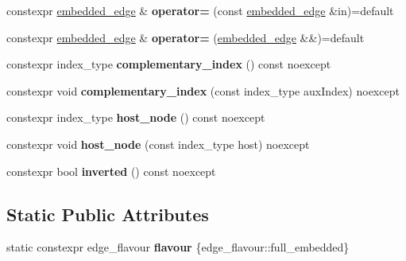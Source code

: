 \begin{DoxyCompactItemize}
\item 
\mbox{\label{classsequoia_1_1maths_1_1embedded__edge_a84dee88dcd34457538bc815160e721dd}} 
constexpr \mbox{\hyperlink{classsequoia_1_1maths_1_1embedded__edge}{embedded\+\_\+edge}} \& {\bfseries operator=} (const \mbox{\hyperlink{classsequoia_1_1maths_1_1embedded__edge}{embedded\+\_\+edge}} \&in)=default
\item 
\mbox{\label{classsequoia_1_1maths_1_1embedded__edge_aeb67baf835feb5f981e90d4304be9445}} 
constexpr \mbox{\hyperlink{classsequoia_1_1maths_1_1embedded__edge}{embedded\+\_\+edge}} \& {\bfseries operator=} (\mbox{\hyperlink{classsequoia_1_1maths_1_1embedded__edge}{embedded\+\_\+edge}} \&\&)=default
\item 
\mbox{\label{classsequoia_1_1maths_1_1embedded__edge_a45b974ba44e020673f6a4ed492123e0c}} 
constexpr index\+\_\+type {\bfseries complementary\+\_\+index} () const noexcept
\item 
\mbox{\label{classsequoia_1_1maths_1_1embedded__edge_a7c20c60df955051930f1dce542b6a8d2}} 
constexpr void {\bfseries complementary\+\_\+index} (const index\+\_\+type aux\+Index) noexcept
\item 
\mbox{\label{classsequoia_1_1maths_1_1embedded__edge_a8b5ee7da93ae653789f6fb0020e37648}} 
constexpr index\+\_\+type {\bfseries host\+\_\+node} () const noexcept
\item 
\mbox{\label{classsequoia_1_1maths_1_1embedded__edge_acd69c46f93db372a7a6238d2654bd399}} 
constexpr void {\bfseries host\+\_\+node} (const index\+\_\+type host) noexcept
\item 
\mbox{\label{classsequoia_1_1maths_1_1embedded__edge_a1629c1963996bc0d49a259fd1b1d0b7c}} 
constexpr bool {\bfseries inverted} () const noexcept
\end{DoxyCompactItemize}
\subsection*{Static Public Attributes}
\begin{DoxyCompactItemize}
\item 
\mbox{\label{classsequoia_1_1maths_1_1embedded__edge_a359f62332eb9b847ab5913fd463a2b46}} 
static constexpr edge\+\_\+flavour {\bfseries flavour} \{edge\+\_\+flavour\+::full\+\_\+embedded\}
\end{DoxyCompactItemize}
